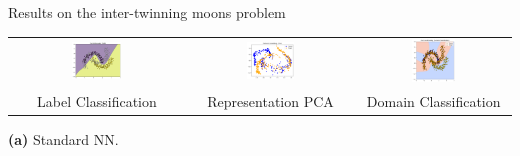\documentclass{beamer}
\begin{document}
\begin{frame}{Results on the inter-twinning moons problem}
\footnotesize
\centering

\begin{minipage}{0.8\linewidth}
\centering
\begin{adjustbox}{max width=\textwidth}
\begin{tabular}{ccc}
\includegraphics[width=0.3\textwidth]{label_decision_vanilla.png} &
\includegraphics[width=0.3\textwidth]{feature_vanilla.png} &
\includegraphics[width=0.3\textwidth]{domain_deciison_vanilla.png} \\
\small Label Classification & \small Representation PCA & \small Domain Classification
\end{tabular}
\end{adjustbox}
\end{minipage}

\vspace{0.0 cm}
\centering
\small\textbf{(a)} Standard NN.

\vspace{0.8cm}


\end{frame}
\end{document}
